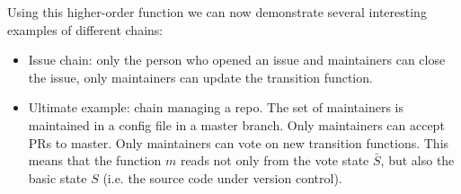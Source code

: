 Using this higher-order function we can now demonstrate several interesting
examples of different chains:
\begin{itemize}
\item Issue chain: only the person who opened an issue and maintainers can close the
  issue, only maintainers can update the transition function.
\item Ultimate example: chain managing a repo. The set of maintainers is
  maintained in a config file in a master branch. Only maintainers can accept PRs
  to master. Only maintainers can vote on new transition functions. This means
  that the function $m$ reads not only from the vote state $\bar S$, but also the
  basic state $S$ (i.e. the source code under version control).
\end{itemize}
